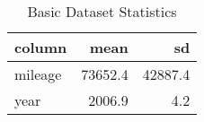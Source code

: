 \begin{table}[ht]
\centering
\begin{tabular}{lrr}
  \hline
column & mean & sd \\ 
  \hline
mileage & 73652.4 & 42887.4 \\ 
  year & 2006.9 & 4.2 \\ 
   \hline
\end{tabular}
\caption{Basic Dataset Statistics} 
\label{tab:data_scale}
\end{table}
